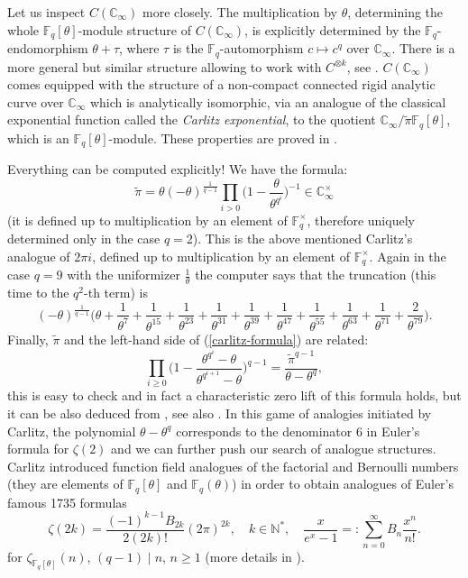\documentclass[11pt]{amsart}
\numberwithin{equation}{section}
\newcommand{\FF}{\mathbb{F}}
\newcommand{\CC}{\mathbb{C}}
\newcommand{\NN}{\mathbb{N}}
\begin{document}
Let us inspect $C(\CC_\infty)$ more closely. The multiplication by $\theta$, determining the whole $\FF_q[\theta]$-module structure of $C(\CC_\infty)$, is explicitly determined by the 
$\FF_q$-endomorphism $\theta+\tau$, where $\tau$ is the $\FF_q$-automorphism $c\mapsto c^q$ over $\CC_\infty$. There is a more general but similar structure allowing to work with $C^{\otimes k}$, see \cite{AND&THA}. $C(\CC_\infty)$ comes equipped with the structure of a non-compact connected rigid analytic curve over $\CC_\infty$ which is analytically isomorphic, via an analogue of the classical exponential function called the {\em Carlitz exponential}, to the quotient
$\CC_\infty/\widetilde{\pi}\FF_q[\theta]$, which is an $\FF_q[\theta]$-module. These properties are proved in \cite[\S 4.4.2]{PEL5}. 

Everything can be computed explicitly! We have the formula: 
\begin{equation}\label{Carlitz-pi}
\widetilde{\pi}=\theta(-\theta)^{\frac{1}{q-1}}\prod_{i>0}\Big(1-\frac{\theta}{\theta^{q^i}}\Big)^{-1}\in\CC_\infty^{\times}
\end{equation}
(it is defined up to multiplication by an element of $\FF_q^\times$, therefore uniquely determined only in the case $q=2$). This is the above mentioned Carlitz's analogue of $2\pi i$, defined up to multiplication by an element of $\FF_q^\times$. Again in the case $q=9$ with the uniformizer $\frac{1}{\theta}$ the computer says that the truncation (this time to the $q^2$-th term) is
$$(-\theta)^{\frac{1}{q-1}}\Big(\theta+\frac{1}{\theta^7}+\frac{1}{\theta^{15}}+
   \frac{1}{\theta^{23}}+\frac{1}{\theta^{31}}+\frac{1}{\theta^{39}}+\frac{1}{\theta^{47}}+\frac{1}{\theta^{55}}+\frac{1}{\theta^{63}}+\frac{1}{\theta^{71}}+\frac{2}{\theta^{79}}\Big).$$
Finally, $\widetilde{\pi}$ and the left-hand side of (\ref{carlitz-formula}) are related:
$$\prod_{i\geq0}\Big(1-\frac{\theta^{q^i}-\theta}{\theta^{q^{i+1}}-\theta}\Big)^{q-1}=\frac{\widetilde{\pi}^{q-1}}{\theta-\theta^q},$$
this is easy to check and in fact a characteristic zero lift of this formula holds, but it can be also deduced from \cite[Lemma 3.2.1]{GOS}, see also \cite[Theorem 4.4.6 and Remark 4.4.7]{PEL5}. In this game of analogies initiated by Carlitz, the polynomial $\theta-\theta^q$  corresponds to the denominator $6$ in Euler's formula for $\zeta(2)$ and we can further push our search of analogue structures. Carlitz introduced function field analogues of the factorial and Bernoulli numbers  (they are elements of $\FF_q[\theta]$ and $\FF_q(\theta)$) in order
to obtain analogues of Euler's famous 1735 formulas
\begin{equation}\label{euler-formulas}
\zeta(2k)=\frac{(-1)^{k-1}B_{2k}}{2(2k)!}(2\pi)^{2k},\quad k\in\NN^*,\quad \frac{x}{e^x-1}=:\sum_{n=0}^\infty B_n\frac{x^n}{n!}.
\end{equation}
for $\zeta_{\FF_q[\theta]}(n)$, $(q-1)\mid n$, $n\geq1$ (more details in \cite{GOS}).
\end{document}
